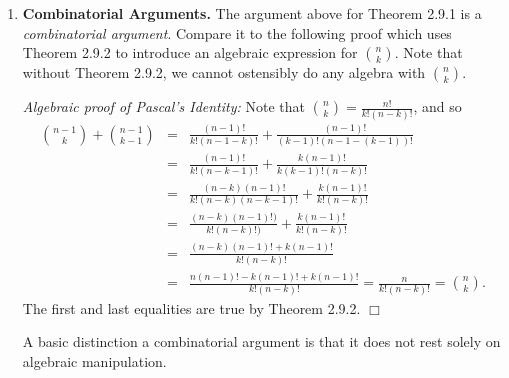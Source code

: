 \documentclass[10pt, AMS Euler]{article}
\newcommand{\N}{\mathbb{N}}
\begin{document}
\begin{enumerate}
{\bf Theorem 2.7.2.} \emph{For $n,k \in \N$, $n^{\underline{k}} = n(n-1)(n-2)\cdots (n - (k-2))(n-(k-1))$.}

\emph{Proof}:  Proceed as in the proof of Theorem 2.7.1, except $i$ ranges from $1$ to $k-1$.  \hfill \rule{2mm}{2mm}

{\bf Theorem 2.9.2.} \emph{For $n, k \in \N$, $\binom{n}{k} = \frac{n!}{k!(n-k)!} = \frac{n^{\underline{k}}}{k!}$.}

\emph{Proof}: Count the number of ways to rearrange $k$ of $n$ objects.  By definition, this is $n^{\underline{k}}$.  But we may perform the
implied task by first selecting which $k$ of the $n$ objects are to be rearranged and then arranging those $k$ objects.
This is done in $\binom{n}{k}k!$ ways.  We have the relationship $n^{\underline{k}} = \binom{n}{k}k!$ which we can solve for the
unknown $\binom{n}{k}$ and obtain $\binom{n}{k} = \frac{n^{\underline{k}}}{k!}$ (the division by $k!$ is possible since $k!$
is never $0$). \hfill \rule{2mm}{2mm}

\item{\bf Combinatorial Arguments.}  The argument above for Theorem 2.9.1 is a \emph{combinatorial argument}.  
Compare it to the following proof which uses Theorem 2.9.2 to introduce an algebraic expression for $\binom{n}{k}$.  
Note that without Theorem 2.9.2, we cannot ostensibly do any algebra with $\binom{n}{k}$.

\emph{Algebraic proof of Pascal's Identity:}  Note that $\binom{n}{k} = \frac{n!}{k!(n-k)!}$, and so 
\begin{eqnarray*} \binom{n-1}{k} + \binom{n-1}{k-1}
&=& \frac{(n-1)!}{k!(n-1-k)!} + \frac{(n-1)!}{(k-1)!(n-1-(k-1))!} \\
&=& \frac{(n-1)!}{k!(n-k-1)!} + \frac{k(n-1)!}{k(k-1)!(n-k)!} \\
&=& \frac{(n-k)(n-1)!}{k!(n-k)(n-k-1)!} + \frac{k(n-1)!}{k!(n-k)!} \\
&=& \frac{(n-k)(n-1)!)}{k!(n-k)!)} + \frac{k(n-1)!}{k!(n-k)!} \\
&=& \frac{(n-k)(n-1)! + k(n-1)!}{k!(n-k)!} \\ 
&= & \frac{n(n-1)! - k(n-1)! + k(n-1)!}{k!(n-k)!} = \frac{n}{k!(n-k)!} = \binom{n}{k}.
\end{eqnarray*}
The first and last equalities are true by Theorem 2.9.2. \hfill $\Box$

A basic distinction a combinatorial argument is that it does not rest solely on algebraic manipulation.  


\end{enumerate}
\end{document}
